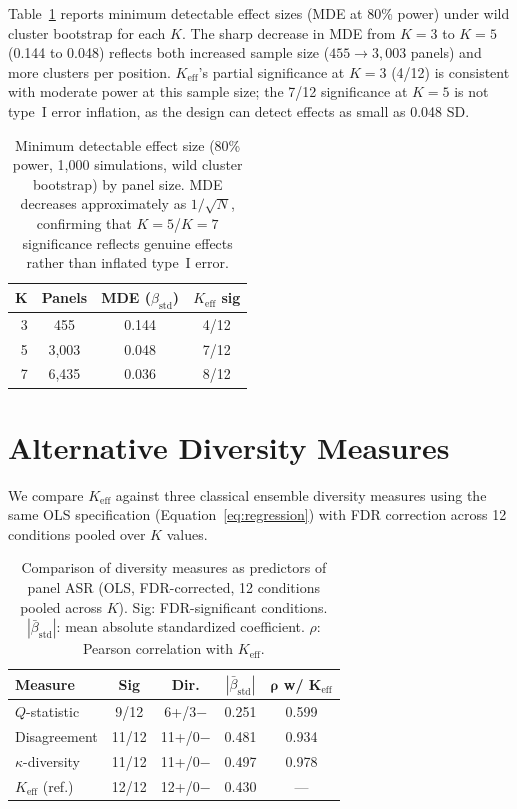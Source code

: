 Table~\ref{tab:mde} reports minimum detectable effect sizes (MDE at 80\% power) under wild cluster bootstrap for each $K$. The sharp decrease in MDE from $K{=}3$ to $K{=}5$ (0.144 to 0.048) reflects both increased sample size ($455 \to 3{,}003$ panels) and more clusters per position. $K_{\mathrm{eff}}$'s partial significance at $K{=}3$ (4/12) is consistent with moderate power at this sample size; the 7/12 significance at $K{=}5$ is not type~I error inflation, as the design can detect effects as small as 0.048 SD.

\begin{table}[h]
\centering
\small
\begin{tabular}{rccc}
\toprule
$\boldsymbol{K}$ & \textbf{Panels} & \textbf{MDE ($\beta_{\mathrm{std}}$)} & \textbf{$K_{\mathrm{eff}}$ sig} \\
\midrule
3 & 455     & 0.144 & 4/12 \\
5 & 3{,}003 & 0.048 & 7/12 \\
7 & 6{,}435 & 0.036 & 8/12 \\
\bottomrule
\end{tabular}
\caption{Minimum detectable effect size (80\% power, 1{,}000 simulations, wild cluster bootstrap) by panel size. MDE decreases approximately as $1/\sqrt{N}$, confirming that $K{=}5$/$K{=}7$ significance reflects genuine effects rather than inflated type~I error.}
\label{tab:mde}
\end{table}

\section{Alternative Diversity Measures}
\label{app:alt_diversity}

We compare $K_{\mathrm{eff}}$ against three classical ensemble diversity measures using the same OLS specification (Equation~\ref{eq:regression}) with FDR correction across 12 conditions pooled over $K$ values.

\begin{table}[h]
\centering
\small
\begin{tabular}{lcccc}
\toprule
\textbf{Measure} & \textbf{Sig} & \textbf{Dir.} & \textbf{$|\bar{\beta}_{\mathrm{std}}|$} & $\boldsymbol{\rho}$ \textbf{w/} $\boldsymbol{K_{\mathrm{eff}}}$ \\
\midrule
$Q$-statistic    & 9/12  & 6+/3$-$ & 0.251 & 0.599 \\
Disagreement     & 11/12 & 11+/0$-$ & 0.481 & 0.934 \\
$\kappa$-diversity & 11/12 & 11+/0$-$ & 0.497 & 0.978 \\
\addlinespace
$K_{\mathrm{eff}}$ (ref.) & 12/12 & 12+/0$-$ & 0.430 & --- \\
\bottomrule
\end{tabular}
\caption{Comparison of diversity measures as predictors of panel ASR (OLS, FDR-corrected, 12 conditions pooled across $K$). Sig: FDR-significant conditions. $|\bar{\beta}_{\mathrm{std}}|$: mean absolute standardized coefficient. $\rho$: Pearson correlation with $K_{\mathrm{eff}}$.}
\label{tab:alt_diversity}
\end{table}

